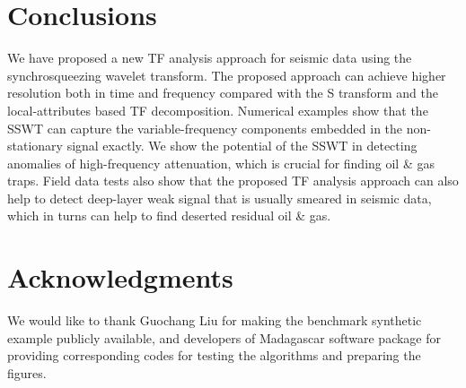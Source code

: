 \section{Conclusions}
We have proposed a new TF analysis approach for seismic data using the synchrosqueezing wavelet transform. The proposed approach can achieve higher resolution both in time and frequency compared with the S transform and the local-attributes based TF decomposition. Numerical examples show that the SSWT can capture the variable-frequency components embedded in the non-stationary signal exactly. We show the potential of the SSWT %
in detecting anomalies of high-frequency attenuation, which is crucial for finding  oil \& gas traps. Field data  tests also show that the proposed TF analysis approach can also help to detect deep-layer weak signal that is usually smeared in seismic data, which in turns can help to find deserted residual oil \& gas.



\section{Acknowledgments}
We would like to thank Guochang Liu for making the benchmark synthetic example publicly available, and developers of Madagascar software package for providing corresponding codes for testing the algorithms and preparing the figures.











